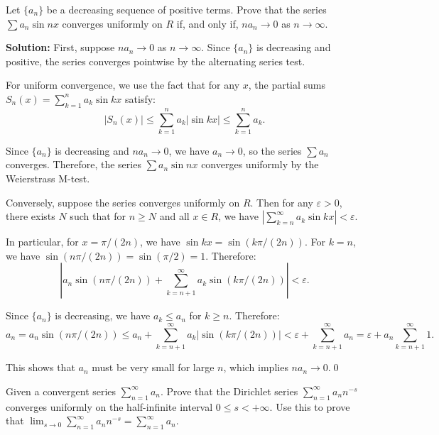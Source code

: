 \begin{problembox}
Let \(\{a_n\}\) be a decreasing sequence of positive terms. Prove that the series \(\sum a_n \sin nx \) converges uniformly on \( R \) if, and only if, \( na_n \to 0 \) as \( n \to \infty \).
\end{problembox}

\noindent\textbf{Solution:} First, suppose \( na_n \to 0 \) as \( n \to \infty \). Since \( \{a_n\} \) is decreasing and positive, the series converges pointwise by the alternating series test.

For uniform convergence, we use the fact that for any \( x \), the partial sums \( S_n(x) = \sum_{k=1}^n a_k \sin kx \) satisfy:
\[|S_n(x)| \leq \sum_{k=1}^n a_k |\sin kx| \leq \sum_{k=1}^n a_k.\]

Since \( \{a_n\} \) is decreasing and \( na_n \to 0 \), we have \( a_n \to 0 \), so the series \( \sum a_n \) converges. Therefore, the series \( \sum a_n \sin nx \) converges uniformly by the Weierstrass M-test.

Conversely, suppose the series converges uniformly on \( R \). Then for any \( \varepsilon > 0 \), there exists \( N \) such that for \( n \geq N \) and all \( x \in R \), we have \( |\sum_{k=n}^{\infty} a_k \sin kx| < \varepsilon \).

In particular, for \( x = \pi/(2n) \), we have \( \sin kx = \sin(k\pi/(2n)) \). For \( k = n \), we have \( \sin(n\pi/(2n)) = \sin(\pi/2) = 1 \). Therefore:
\[|a_n \sin(n\pi/(2n)) + \sum_{k=n+1}^{\infty} a_k \sin(k\pi/(2n))| < \varepsilon.\]

Since \( \{a_n\} \) is decreasing, we have \( a_k \leq a_n \) for \( k \geq n \). Therefore:
\[a_n = a_n \sin(n\pi/(2n)) \leq a_n + \sum_{k=n+1}^{\infty} a_k |\sin(k\pi/(2n))| < \varepsilon + \sum_{k=n+1}^{\infty} a_n = \varepsilon + a_n \sum_{k=n+1}^{\infty} 1.\]

This shows that \( a_n \) must be very small for large \( n \), which implies \( na_n \to 0 \).\qed


\begin{problembox}
Given a convergent series \(\sum_{n=1}^{\infty} a_n \). Prove that the Dirichlet series \(\sum_{n=1}^{\infty} a_n n^{-s}\) converges uniformly on the half-infinite interval \( 0 \leq s < +\infty \). Use this to prove that \(\lim_{s \to 0} \sum_{n=1}^{\infty} a_n n^{-s} = \sum_{n=1}^{\infty} a_n\).
\end{problembox}

